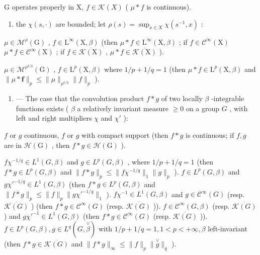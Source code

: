 G operates properly in X, \(f \in \mathcal{K}(X)\) ( \(\mu * f\) is continuous).

\begin{enumerate}
\def\labelenumi{(\alph{enumi})}
\setcounter{enumi}{1}
\tightlist
\item
  the \(\chi(s, \cdot)\) are bounded; let \(\rho(s) = \sup_{x \in X} \chi(s^{-1}, x)\) :
\end{enumerate}

\(\mu \in \mathcal{M}^{\rho}(\mathrm{G})\) , \(f\in \mathrm{L}^{\infty}(\mathrm{X},\beta)\) (then \(\mu *f\in \mathrm{L}^{\infty}(\mathrm{X},\beta)\) ; if \(f\in \mathcal{C}^{\infty}(\mathrm{X})\) \(\mu *f\in \mathcal{C}^{\infty}(\mathrm{X})\) ; if \(f\in \overline{\mathcal{K}(\mathrm{X})}\) , \(\mu *f\in \overline{\mathcal{K}(\mathrm{X})}\) ).

\(\mu \in \mathcal{M}^{\rho^{1 / q}}(\mathrm{G})\) , \(f\in \mathrm{L}^p (\mathrm{X},\beta)\) where \(1 / p + 1 / q = 1\) (then \(\mu *f\in \mathrm{L}^p (\mathrm{X},\beta)\) and \(\| \mu *\boldsymbol {f}\| _p\leqslant \| \mu \|_{\rho^{1 / q}}\| f\| _p\) ).

\begin{enumerate}
\def\labelenumi{\Roman{enumi}.}
\setcounter{enumi}{2}
\tightlist
\item
  --- The case that the convolution product \(f * g\) of two locally \(\beta\) -integrable functions exists ( \(\beta\) a relatively invariant measure \(\geqslant 0\) on a group \(G\) , with left and right multipliers \(\chi\) and \(\chi'\) ):
\end{enumerate}

\(f\) or \(g\) continuous, \(f\) or \(g\) with compact support (then \(f*g\) is continuous; if \(f,g\) are in \(\mathcal{H}(\mathrm{G})\) , then \(f*g\in\mathcal{H}(\mathrm{G})\) ).

\(f\chi^{-1/q} \in L^{1}(G,\beta)\) and \(g \in L^{p}(G,\beta)\) , where \(1/p + 1/q = 1\) (then \(f*g \in L^{p}(G,\beta)\) and \(\|f*g\|_{p} \leqslant \|f\chi^{-1/q}\|_{1} \|g\|_{p}\) ). \(f \in L^{p}(G,\beta)\) and \(g\chi'^{-1/q} \in L^{1}(G,\beta)\) (then \(f*g \in L^{p}(G,\beta)\) and \(\|f*g\|_{p} \leqslant \|f\|_{p} \|g\chi'^{-1/q}\|_{1}\) ). \(f\chi^{-1} \in L^{1}(G,\beta)\) and \(g \in \mathcal{C}^{\infty}(G)\) (resp. \(\overline{\mathcal{K}(G)}\) ) (then \(f*g \in \mathcal{C}^{\infty}(G)\) (resp. \(\overline{\mathcal{K}(G)}\) )). \(f \in \mathcal{C}^{\infty}(G,\beta)\) (resp. \(\overline{\mathcal{K}(G)}\) ) and \(g\chi'^{-1} \in L^{1}(G,\beta)\) (then \(f*g \in \mathcal{C}^{\infty}(G)\) (resp. \(\overline{\mathcal{K}(G)}\) )). \(f \in L^{p}(G,\beta), g \in L^{q}(G, \overset{\vee}{\beta})\) with \(1/p + 1/q = 1, 1 < p < +\infty, \beta\) left-invariant (then \(f*g \in \overline{\mathcal{K}(G)}\) and \(\|f*g\|_{\infty} \leqslant \|f\|_{p} \| \overset{\vee}{g}\|_{q}\) ).
